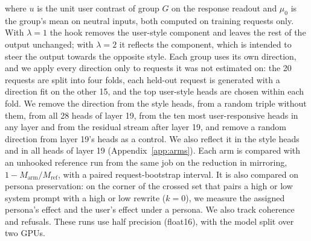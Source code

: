 where $u$ is the unit user contrast of group $G$ on the response readout and $\mu_0$ is the group's mean on neutral inputs, both computed on training requests only. With $\lambda = 1$ the hook removes the user-style component and leaves the rest of the output unchanged; with $\lambda = 2$ it reflects the component, which is intended to steer the output towards the opposite style. Each group uses its own direction, and we apply every direction only to requests it was not estimated on: the 20 requests are split into four folds, each held-out request is generated with a direction fit on the other 15, and the top user-style heads are chosen within each fold. We remove the direction from the style heads, from a random triple without them, from all 28 heads of layer 19, from the ten most user-responsive heads in any layer and from the residual stream after layer 19, and remove a random direction from layer 19's heads as a control. We also reflect it in the style heads and in all heads of layer 19 (Appendix~\ref{app:arms}). Each arm is compared with an unhooked reference run from the same job on the reduction in mirroring, $1 - M_{\text{arm}}/M_{\text{ref}}$, with a paired request-bootstrap interval. It is also compared on persona preservation: on the corner of the crossed set that pairs a high or low system prompt with a high or low rewrite ($k=0$), we measure the assigned persona's effect and the user's effect under a persona. We also track coherence and refusals. These runs use half precision (float16), with the model split over two GPUs.


